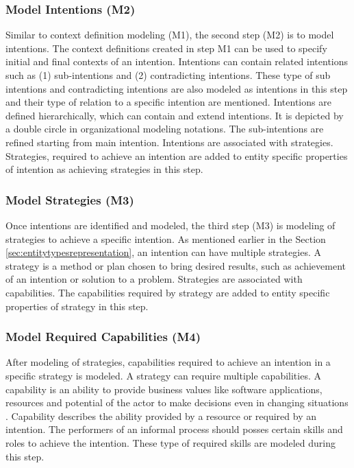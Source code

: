\subsubsection{Model Intentions (M2)}  
Similar to context definition modeling (M1), the second step (M2) is to model intentions. The context definitions created in step M1 can be used to specify initial and final contexts of an intention. Intentions can contain related intentions such as (1) sub-intentions and (2) contradicting intentions. These type of sub intentions and contradicting intentions are also modeled as intentions in this step and their type of relation to a specific intention are mentioned. Intentions are defined hierarchically, which can contain and extend intentions. It is depicted by a double circle in organizational modeling notations. The sub-intentions are refined starting from main intention. Intentions are associated with strategies. Strategies, required to achieve an intention are added to entity specific properties of intention as achieving strategies in this step.

\subsubsection{Model Strategies (M3)}  
Once intentions are identified and modeled, the third step (M3) is modeling of strategies to achieve a specific intention. As mentioned earlier in the Section \ref{sec:entitytypesrepresentation}, an intention can have multiple strategies.  A strategy is a method or plan chosen to bring desired results, such as achievement of an intention or solution to a problem. Strategies are associated with capabilities. The capabilities required by strategy are added to entity specific properties of strategy in this step. 

\subsubsection{Model Required Capabilities (M4)}  
After modeling of strategies, capabilities required to achieve an intention in a specific strategy is modeled. A strategy can require multiple capabilities. A capability is an ability to provide business values like software applications, resources and potential of the actor to make decisions even in changing situations \cite{Stirna2012}. Capability describes the ability provided by a resource or required by an intention. The performers of an informal process should posses certain skills and roles to achieve the intention. These type of required skills are modeled during this step.

